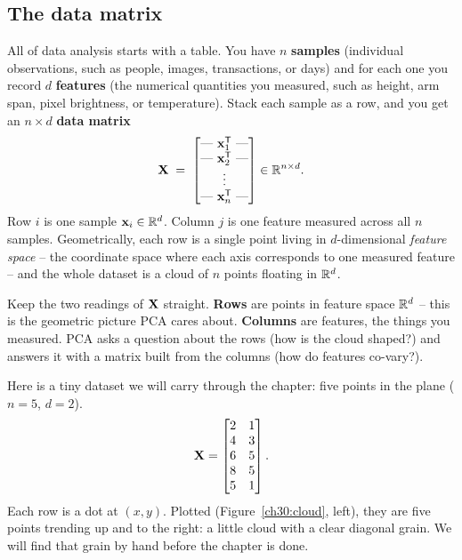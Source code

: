 \subsection{The data matrix}

All of data analysis starts with a table. You have $n$ \textbf{samples}
(individual observations, such as people, images, transactions, or days) and for each
one you record $d$ \textbf{features} (the numerical quantities you measured, such as
height, arm span, pixel brightness, or temperature). Stack each sample as a row, and
you get an $n\times d$ \textbf{data matrix}
\[
  \mathbf{X} \;=\;
  \begin{bmatrix}
    \text{---}\ \mathbf{x}_1^{\mathsf{T}}\ \text{---}\\
    \text{---}\ \mathbf{x}_2^{\mathsf{T}}\ \text{---}\\
    \vdots\\
    \text{---}\ \mathbf{x}_n^{\mathsf{T}}\ \text{---}
  \end{bmatrix}
  \in\mathbb{R}^{n\times d}.
\]
Row $i$ is one sample $\mathbf{x}_i\in\mathbb{R}^d$. Column $j$ is one feature measured across
all $n$ samples. Geometrically, each row is a single point living in
$d$-dimensional \emph{feature space} -- the coordinate space where each axis
corresponds to one measured feature -- and the whole dataset is a cloud of $n$
points floating in $\mathbb{R}^d$.

\begin{focusbox}
Keep the two readings of $\mathbf{X}$ straight. \textbf{Rows} are points in feature
space $\mathbb{R}^d$ -- this is the geometric picture PCA cares about. \textbf{Columns}
are features, the things you measured. PCA asks a question about the rows (how is
the cloud shaped?) and answers it with a matrix built from the columns (how do
features co-vary?).
\end{focusbox}

\begin{example}\label{ch30:tiny-data}
Here is a tiny dataset we will carry through the chapter: five points in the plane
($n=5$, $d=2$).
\[
  \mathbf{X} =
  \begin{bmatrix}
    2 & 1\\
    4 & 3\\
    6 & 5\\
    8 & 5\\
    5 & 1
  \end{bmatrix}.
\]
Each row is a dot at $(x,y)$. Plotted (Figure~\ref{ch30:cloud}, left), they are five
points trending up and to the right: a little cloud with a clear diagonal grain. We will find that grain by
hand before the chapter is done.
\end{example}

